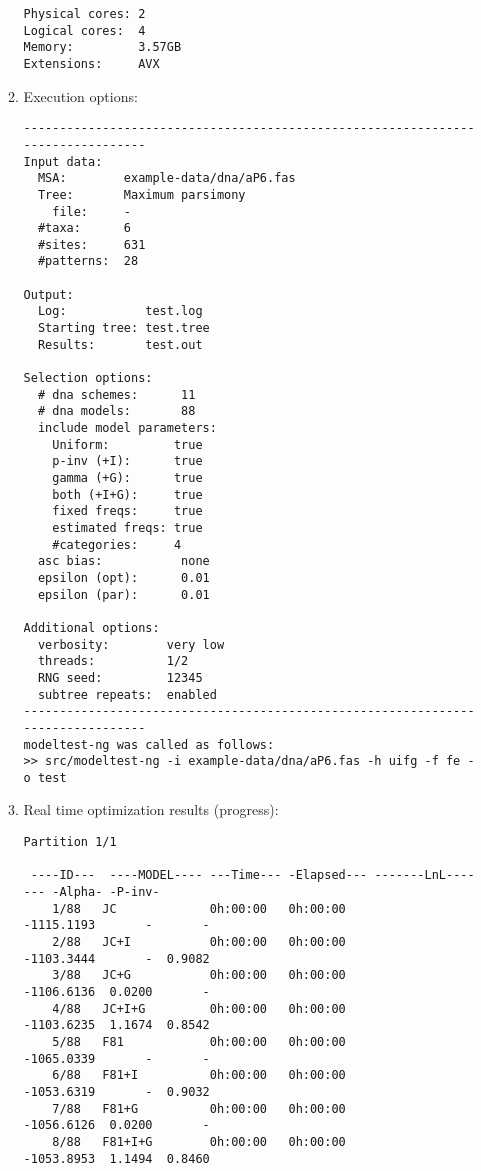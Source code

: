\begin{enumerate}
\begin{enumerate}
\begin{lstlisting}
Physical cores: 2
Logical cores:  4
Memory:         3.57GB
Extensions:     AVX

\end{lstlisting}

\item Execution options:

\begin{lstlisting}
--------------------------------------------------------------------------------
Input data:
  MSA:        example-data/dna/aP6.fas
  Tree:       Maximum parsimony
    file:     -
  #taxa:      6
  #sites:     631
  #patterns:  28

Output:
  Log:           test.log
  Starting tree: test.tree
  Results:       test.out

Selection options:
  # dna schemes:      11
  # dna models:       88
  include model parameters:
    Uniform:         true
    p-inv (+I):      true
    gamma (+G):      true
    both (+I+G):     true
    fixed freqs:     true
    estimated freqs: true
    #categories:     4
  asc bias:           none
  epsilon (opt):      0.01
  epsilon (par):      0.01

Additional options:
  verbosity:        very low
  threads:          1/2
  RNG seed:         12345
  subtree repeats:  enabled
--------------------------------------------------------------------------------
modeltest-ng was called as follows:
>> src/modeltest-ng -i example-data/dna/aP6.fas -h uifg -f fe -o test
\end{lstlisting}

\item Real time optimization results (progress):

\begin{lstlisting}
Partition 1/1

 ----ID---  ----MODEL---- ---Time--- -Elapsed--- -------LnL------- -Alpha- -P-inv-
    1/88   JC             0h:00:00   0h:00:00           -1115.1193       -       -
    2/88   JC+I           0h:00:00   0h:00:00           -1103.3444       -  0.9082
    3/88   JC+G           0h:00:00   0h:00:00           -1106.6136  0.0200       -
    4/88   JC+I+G         0h:00:00   0h:00:00           -1103.6235  1.1674  0.8542
    5/88   F81            0h:00:00   0h:00:00           -1065.0339       -       -
    6/88   F81+I          0h:00:00   0h:00:00           -1053.6319       -  0.9032
    7/88   F81+G          0h:00:00   0h:00:00           -1056.6126  0.0200       -
    8/88   F81+I+G        0h:00:00   0h:00:00           -1053.8953  1.1494  0.8460


\end{lstlisting}
\end{enumerate}
\end{enumerate}

